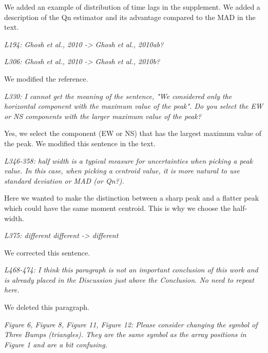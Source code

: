 \documentclass[letterpaper, 12pt]{article}
\begin{document}
\bigskip

We added an example of distribution of time lags in the supplement. We added a description of the Qn estimator and its advantage compared to the MAD in the text.

\bigskip

\textit{L194: Ghosh et al., 2010 -> Ghosh et al., 2010ab?}

\textit{L306: Ghosh et al., 2010 -> Ghosh et al., 2010b?}

\bigskip

We modified the reference.

\bigskip

\textit{L330: I cannot get the meaning of the sentence, "We considered only the horizontal component with the maximum value of the peak". Do you select the EW or NS components with the larger maximum value of the peak?}

\bigskip

Yes, we select the component (EW or NS) that has the largest maximum value of the peak. We modified this sentence in the text.

\bigskip

\textit{L346-358: half width is a typical measure for uncertainties when picking a peak value. In this case, when picking a centroid value, it is more natural to use standard deviation or MAD (or Qn?).}

\bigskip

Here we wanted to make the distinction between a sharp peak and a flatter peak which could have the same moment centroid. This is why we choose the half-width.

\bigskip

\textit{L375: different different -> different}

\bigskip

We corrected this sentence.

\bigskip

\textit{L468-474: I think this paragraph is not an important conclusion of this work and is already placed in the Discussion just above the Conclusion. No need to repeat here.}

\bigskip

We deleted this paragraph.

\bigskip

\textit{Figure 6, Figure 8, Figure 11, Figure 12: Please consider changing the symbol of Three Bumps (triangles). They are the same symbol as the array positions in Figure 1 and are a bit confusing.}
\end{document}
